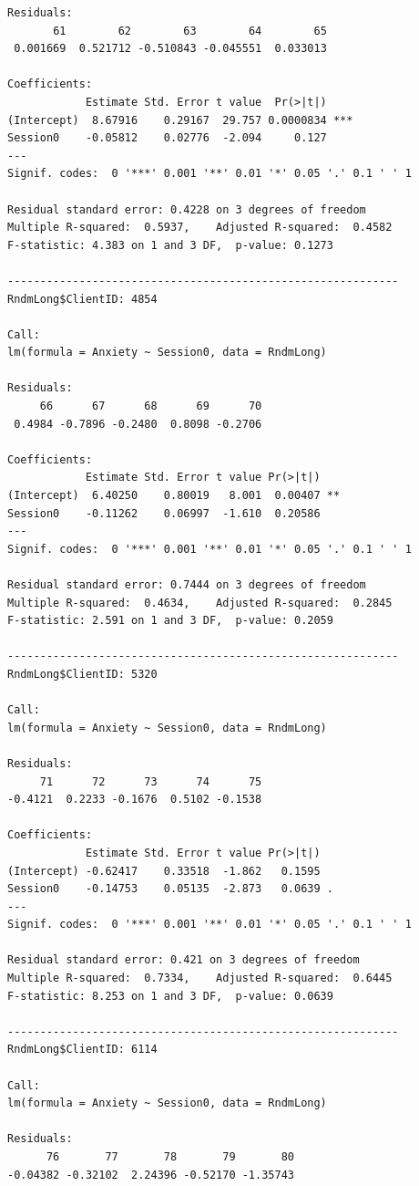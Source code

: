 \documentclass[
  english,
]{book}
\begin{document}
\begin{verbatim}
Residuals:
       61        62        63        64        65 
 0.001669  0.521712 -0.510843 -0.045551  0.033013 

Coefficients:
            Estimate Std. Error t value  Pr(>|t|)    
(Intercept)  8.67916    0.29167  29.757 0.0000834 ***
Session0    -0.05812    0.02776  -2.094     0.127    
---
Signif. codes:  0 '***' 0.001 '**' 0.01 '*' 0.05 '.' 0.1 ' ' 1

Residual standard error: 0.4228 on 3 degrees of freedom
Multiple R-squared:  0.5937,    Adjusted R-squared:  0.4582 
F-statistic: 4.383 on 1 and 3 DF,  p-value: 0.1273

------------------------------------------------------------ 
RndmLong$ClientID: 4854

Call:
lm(formula = Anxiety ~ Session0, data = RndmLong)

Residuals:
     66      67      68      69      70 
 0.4984 -0.7896 -0.2480  0.8098 -0.2706 

Coefficients:
            Estimate Std. Error t value Pr(>|t|)   
(Intercept)  6.40250    0.80019   8.001  0.00407 **
Session0    -0.11262    0.06997  -1.610  0.20586   
---
Signif. codes:  0 '***' 0.001 '**' 0.01 '*' 0.05 '.' 0.1 ' ' 1

Residual standard error: 0.7444 on 3 degrees of freedom
Multiple R-squared:  0.4634,    Adjusted R-squared:  0.2845 
F-statistic: 2.591 on 1 and 3 DF,  p-value: 0.2059

------------------------------------------------------------ 
RndmLong$ClientID: 5320

Call:
lm(formula = Anxiety ~ Session0, data = RndmLong)

Residuals:
     71      72      73      74      75 
-0.4121  0.2233 -0.1676  0.5102 -0.1538 

Coefficients:
            Estimate Std. Error t value Pr(>|t|)  
(Intercept) -0.62417    0.33518  -1.862   0.1595  
Session0    -0.14753    0.05135  -2.873   0.0639 .
---
Signif. codes:  0 '***' 0.001 '**' 0.01 '*' 0.05 '.' 0.1 ' ' 1

Residual standard error: 0.421 on 3 degrees of freedom
Multiple R-squared:  0.7334,    Adjusted R-squared:  0.6445 
F-statistic: 8.253 on 1 and 3 DF,  p-value: 0.0639

------------------------------------------------------------ 
RndmLong$ClientID: 6114

Call:
lm(formula = Anxiety ~ Session0, data = RndmLong)

Residuals:
      76       77       78       79       80 
-0.04382 -0.32102  2.24396 -0.52170 -1.35743 


\end{verbatim}
\end{document}
